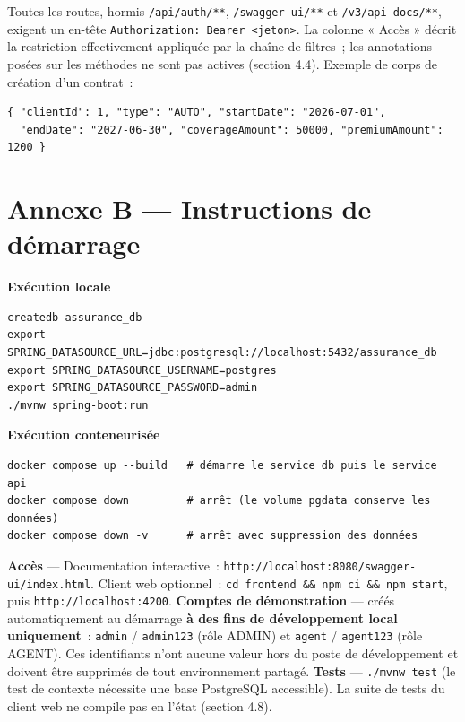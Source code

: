 \documentclass[12pt,a4paper]{report}
\begin{document}
Toutes les routes, hormis \texttt{/api/auth/**}, \texttt{/swagger-ui/**} et \texttt{/v3/api-docs/**}, exigent un en-tête \texttt{Authorization: Bearer <jeton>}. La colonne « Accès » décrit la restriction effectivement appliquée par la chaîne de filtres~; les annotations posées sur les méthodes ne sont pas actives (section 4.4).
Exemple de corps de création d'un contrat~:
\begin{verbatim}
{ "clientId": 1, "type": "AUTO", "startDate": "2026-07-01",
  "endDate": "2027-06-30", "coverageAmount": 50000, "premiumAmount": 1200 }
\end{verbatim}
\chapter*{Annexe B — Instructions de démarrage}
\textbf{Exécution locale}
\begin{verbatim}
createdb assurance_db
export SPRING_DATASOURCE_URL=jdbc:postgresql://localhost:5432/assurance_db
export SPRING_DATASOURCE_USERNAME=postgres
export SPRING_DATASOURCE_PASSWORD=admin
./mvnw spring-boot:run
\end{verbatim}
\textbf{Exécution conteneurisée}
\begin{verbatim}
docker compose up --build   # démarre le service db puis le service api
docker compose down         # arrêt (le volume pgdata conserve les données)
docker compose down -v      # arrêt avec suppression des données
\end{verbatim}
\textbf{Accès} — Documentation interactive~: \texttt{http://localhost:8080/swagger-ui/index.html}. Client web optionnel~: \texttt{cd frontend \&\& npm ci \&\& npm start}, puis \texttt{http://localhost:4200}.
\textbf{Comptes de démonstration} — créés automatiquement au démarrage \textbf{à des fins de développement local uniquement}~: \texttt{admin} / \texttt{admin123} (rôle ADMIN) et \texttt{agent} / \texttt{agent123} (rôle AGENT). Ces identifiants n'ont aucune valeur hors du poste de développement et doivent être supprimés de tout environnement partagé.
\textbf{Tests} — \texttt{./mvnw test} (le test de contexte nécessite une base PostgreSQL accessible). La suite de tests du client web ne compile pas en l'état (section 4.8).
\end{document}
